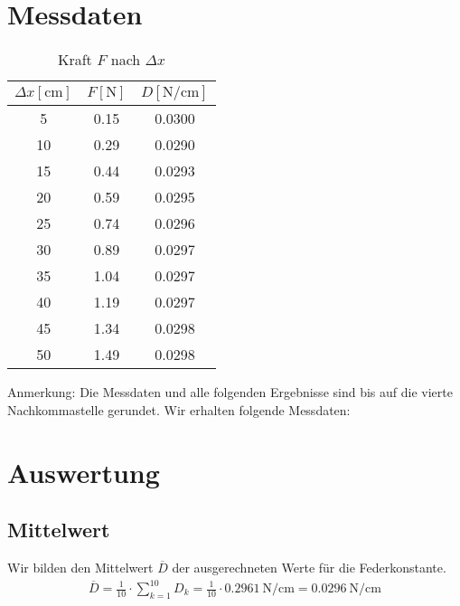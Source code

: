 \section{Messdaten}
\begin{table}
    \centering
    \caption{Kraft $ F $ nach $ \Delta x $ }
    \begin{tabular}{S S S}
        \toprule
        {$ \Delta x  [\unit{\cm}]$}  & {$ F [\unit{\newton}]  $}   & {$ D  [\unit{\newton\per\cm}] $} \\
        \midrule
        5             &  0.15      & 0.0300 \\
        10            &  0.29      & 0.0290 \\
        15            &  0.44      & 0.0293 \\
        20            &  0.59      & 0.0295 \\
        25            &  0.74      & 0.0296 \\
        30            &  0.89      & 0.0297 \\
        35            &  1.04      & 0.0297 \\
        40            &  1.19      & 0.0297 \\
        45            &  1.34      & 0.0298 \\
        50            &  1.49      & 0.0298 \\
        

    \end{tabular}
\end{table}

Anmerkung: Die Messdaten und alle folgenden Ergebnisse sind bis auf die vierte Nachkommastelle gerundet.
Wir erhalten folgende Messdaten:

\section{Auswertung}
\subsection{Mittelwert}
Wir bilden den Mittelwert $\overline{D}$ der ausgerechneten Werte für die Federkonstante.
\begin{align}
    \overline{D} =\frac{1}{10} \cdot \sum_{k=1}^{10} D_k = \frac{1}{10} \cdot \qty{0.2961}{\newton\per\cm} = \qty{0.0296}{\newton\per\cm} 
\end{align}

